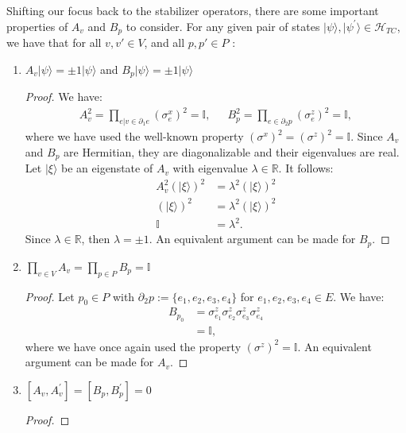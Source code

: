 \documentclass[12pt]{article}
\def\II{\mathbb{I}}
\def\RR{\mathbb{R}}
\theoremstyle{definition}
\begin{document}
Shifting our focus back to the stabilizer operators, there are some important properties of $A_v$ and $B_p$ to consider. For any given pair of states $|\psi\rangle,|\psi^{'}\rangle\in\mathcal{H}_{TC}$, we have that for all $v,v'\in V$, and all $p,p'\in P$ \cite{kitaev1997}:
    \begin{enumerate}
        \item $A_v|\psi\rangle = \pm1|\psi\rangle$ and $B_p|\psi\rangle = \pm1|\psi\rangle$
            \begin{proof}
                We have:
                    \begin{align}
                        A^2_v = \prod_{e|v\in\partial_1e}(\sigma^x_e)^2 = \II,\enspace\enspace\enspace B^2_p = \prod_{e\in\partial_2p}(\sigma^z_e)^2 = \II,
                    \end{align}
                where we have used the well-known property $(\sigma^x)^2 = (\sigma^z)^2 = \II$. Since $A_v$ and $B_p$ are Hermitian, they are diagonalizable and their eigenvalues are real. Let $|\xi\rangle$ be an eigenstate of $A_v$ with eigenvalue $\lambda\in\RR$. It follows:
                    \begin{align}
                        A^2_v(|\xi\rangle)^2 &= \lambda^2(|\xi\rangle)^2\\
                        (|\xi\rangle)^2 &= \lambda^2(|\xi\rangle)^2\\
                        \II &= \lambda^2.
                    \end{align}
                Since $\lambda\in\RR$, then $\lambda = \pm1$. An equivalent argument can be made for $B_p$.
            \end{proof}
        \item $\prod_{v\in V}A_v = \prod_{p\in P}B_p = \II$
            \begin{proof}
                Let $p_0\in P$ with $\partial_2p := \{e_1,e_2,e_3,e_4\}$ for $e_1,e_2,e_3,e_4\in E$. We have:
                    \begin{align}
                        B_{p_0} &= \sigma^z_{e_1}\sigma^z_{e_2}\sigma^z_{e_3}\sigma^z_{e_4}\\
                        &= \II,
                    \end{align}
                where we have once again used the property $(\sigma^z)^2 = \II$. An equivalent argument can be made for $A_v$.
            \end{proof}
        \item $[A_v,A^{'}_v] = [B_p,B^{'}_p] = 0$
            \begin{proof}

\end{proof}
\end{enumerate}
\end{document}

